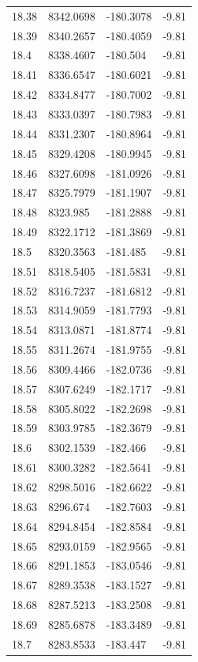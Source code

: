 \begin{table}[H]
\begin{tabular}{llll}
18.38 & 8342.0698 & -180.3078 & -9.81 \\
18.39 & 8340.2657 & -180.4059 & -9.81 \\
18.4 & 8338.4607 & -180.504 & -9.81 \\
18.41 & 8336.6547 & -180.6021 & -9.81 \\
18.42 & 8334.8477 & -180.7002 & -9.81 \\
18.43 & 8333.0397 & -180.7983 & -9.81 \\
18.44 & 8331.2307 & -180.8964 & -9.81 \\
18.45 & 8329.4208 & -180.9945 & -9.81 \\
18.46 & 8327.6098 & -181.0926 & -9.81 \\
18.47 & 8325.7979 & -181.1907 & -9.81 \\
18.48 & 8323.985 & -181.2888 & -9.81 \\
18.49 & 8322.1712 & -181.3869 & -9.81 \\
18.5 & 8320.3563 & -181.485 & -9.81 \\
18.51 & 8318.5405 & -181.5831 & -9.81 \\
18.52 & 8316.7237 & -181.6812 & -9.81 \\
18.53 & 8314.9059 & -181.7793 & -9.81 \\
18.54 & 8313.0871 & -181.8774 & -9.81 \\
18.55 & 8311.2674 & -181.9755 & -9.81 \\
18.56 & 8309.4466 & -182.0736 & -9.81 \\
18.57 & 8307.6249 & -182.1717 & -9.81 \\
18.58 & 8305.8022 & -182.2698 & -9.81 \\
18.59 & 8303.9785 & -182.3679 & -9.81 \\
18.6 & 8302.1539 & -182.466 & -9.81 \\
18.61 & 8300.3282 & -182.5641 & -9.81 \\
18.62 & 8298.5016 & -182.6622 & -9.81 \\
18.63 & 8296.674 & -182.7603 & -9.81 \\
18.64 & 8294.8454 & -182.8584 & -9.81 \\
18.65 & 8293.0159 & -182.9565 & -9.81 \\
18.66 & 8291.1853 & -183.0546 & -9.81 \\
18.67 & 8289.3538 & -183.1527 & -9.81 \\
18.68 & 8287.5213 & -183.2508 & -9.81 \\
18.69 & 8285.6878 & -183.3489 & -9.81 \\
18.7 & 8283.8533 & -183.447 & -9.81 \\

\end{tabular}
\end{table}
